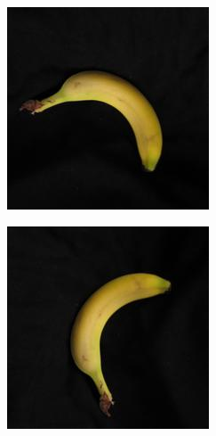 \documentclass{article} %
\begin{document}
\begin{figure}[h]
\begin{subfigure}{.123\textwidth}
\end{subfigure}%
  \begin{subfigure}{.123\textwidth}
  \centering
\includegraphics[width=\textwidth]{1_3.jpg}
\end{subfigure}%
  \begin{subfigure}{.123\textwidth}
  \centering
\includegraphics[width=\textwidth]{1_4.jpg}

\end{subfigure}
\end{figure}
\end{document}
